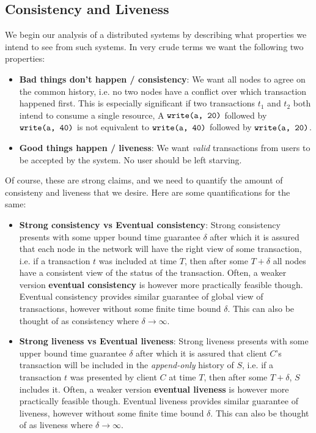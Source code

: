 \subsection{Consistency and Liveness}

We begin our analysis of a distributed systems by describing what properties we intend to see from such systems. In very crude terms we want the following two properties:
\begin{itemize}
    \item \textbf{Bad things don't happen / consistency}: We want all nodes to agree on the common history, i.e. no two nodes have a conflict over which transaction happened first. This is especially significant if two transactions $t_1$ and $t_2$ both intend to consume a single resource, A $\verb|write(a, 20)|$ followed by $\verb|write(a, 40)|$ is not equivalent to $\verb|write(a, 40)|$ followed by $\verb|write(a, 20)|$.
    \item \textbf{Good things happen / liveness}: We want \emph{valid} transactions from users to be accepted by the system. No user should be left starving.
\end{itemize}

Of course, these are strong claims, and we need to quantify the amount of consisteny and liveness that we desire. Here are some quantifications for the same:

\begin{itemize}
    \item \textbf{Strong consistency vs Eventual consistency}:    Strong consistency presents with some upper bound time guarantee $\delta$ after which it is assured that each node in the network will have the right view of some transaction, i.e. if a transaction $t$ was included at time $T$, then after some $T+\delta$ all nodes have a consistent view of the status of the transaction. Often, a weaker version \textbf{eventual consistency} is however more practically feasible though. Eventual consistency provides similar guarantee of global view of transactions, however without some finite time bound $\delta$. This can also be thought of as consistency where $\delta \to \infty$.
    \item \textbf{Strong liveness vs Eventual liveness}:    Strong liveness presents with some upper bound time guarantee $\delta$ after which it is assured that client $C$'s transaction will be included in the \emph{append-only} history of $S$, i.e. if a transaction $t$ was presented by client $C$ at time $T$, then after some $T+\delta$, $S$ includes it. Often, a weaker version \textbf{eventual liveness} is however more practically feasible though. Eventual liveness provides similar guarantee of liveness, however without some finite time bound $\delta$. This can also be thought of as liveness where $\delta \to \infty$.
\end{itemize}

